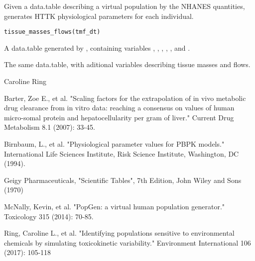 \documentclass[a4paper]{book}
\begin{document}
%
\begin{Description}\relax
Given a data.table describing a virtual population by the NHANES quantities, 
generates HTTK physiological parameters for each individual.
\end{Description}
%
\begin{Usage}
\begin{verbatim}
tissue_masses_flows(tmf_dt)
\end{verbatim}
\end{Usage}
%
\begin{Arguments}
\begin{ldescription}
\item[\code{tmf\_dt}] A data.table generated by
, containing variables ,
, , , , and
.
\end{ldescription}
\end{Arguments}
%
\begin{Value}
The same data.table, with aditional variables describing tissue masses
and flows.
\end{Value}
%
\begin{Author}\relax
Caroline Ring
\end{Author}
%
\begin{References}\relax
Barter, Zoe E., et al. "Scaling factors for the extrapolation of in vivo 
metabolic drug clearance from in vitro data: reaching a consensus on values 
of human micro-somal protein and hepatocellularity per gram of liver." Current 
Drug Metabolism 8.1 (2007): 33-45.

Birnbaum, L., et al. "Physiological parameter values for PBPK models." 
International Life Sciences Institute, Risk Science Institute, Washington, 
DC (1994).

Geigy Pharmaceuticals, "Scientific Tables", 7th Edition, 
John Wiley and Sons (1970)

McNally, Kevin, et al. "PopGen: a virtual human population generator." 
Toxicology 315 (2014): 70-85.

Ring, Caroline L., et al. "Identifying populations sensitive to 
environmental chemicals by simulating toxicokinetic variability." Environment 
International 106 (2017): 105-118
\end{References}
\end{document}
